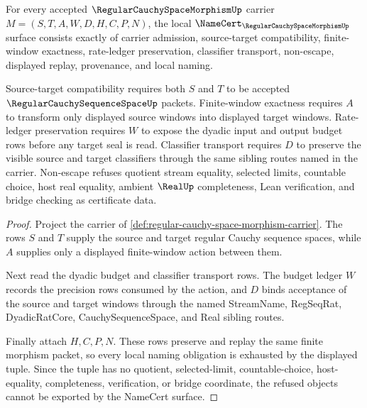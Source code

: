 \begin{theorem}
\label{thm:regular-cauchy-space-morphism-namecert-obligations}
For every accepted $\RegularCauchySpaceMorphismUp$ carrier $M=(S,T,A,W,D,H,C,P,N)$, the local $\NameCert_{\RegularCauchySpaceMorphismUp}$ surface consists exactly of carrier admission, source-target compatibility, finite-window exactness, rate-ledger preservation, classifier transport, non-escape, displayed replay, provenance, and local naming.

Source-target compatibility requires both $S$ and $T$ to be accepted $\RegularCauchySequenceSpaceUp$ packets. Finite-window exactness requires $A$ to transform only displayed source windows into displayed target windows. Rate-ledger preservation requires $W$ to expose the dyadic input and output budget rows before any target seal is read. Classifier transport requires $D$ to preserve the visible source and target classifiers through the same sibling routes named in the carrier. Non-escape refuses quotient stream equality, selected limits, countable choice, host real equality, ambient $\RealUp$ completeness, Lean verification, and bridge checking as certificate data.
\end{theorem}
\begin{proof}
Project the carrier of \autoref{def:regular-cauchy-space-morphism-carrier}. The rows $S$ and $T$ supply the source and target regular Cauchy sequence spaces, while $A$ supplies only a displayed finite-window action between them.

Next read the dyadic budget and classifier transport rows. The budget ledger $W$ records the precision rows consumed by the action, and $D$ binds acceptance of the source and target windows through the named StreamName, RegSeqRat, DyadicRatCore, CauchySequenceSpace, and Real sibling routes.

Finally attach $H,C,P,N$. These rows preserve and replay the same finite morphism packet, so every local naming obligation is exhausted by the displayed tuple. Since the tuple has no quotient, selected-limit, countable-choice, host-equality, completeness, verification, or bridge coordinate, the refused objects cannot be exported by the NameCert surface.
\end{proof}

